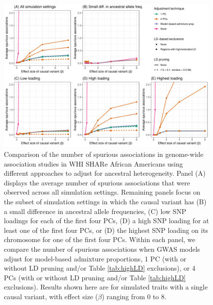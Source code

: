 \documentclass[12pt]{article}
\begin{document}
\begin{figure}
\includegraphics[width=\textwidth]{figs/spurious_counts/gwas/spurious_allbeta}
\caption{Comparison of the number of spurious associations in genome-wide association studies in WHI SHARe African Americans using different approaches to adjust for ancestral heterogeneity. Panel (A) displays the average number of spurious associations that were observed across all simulation settings. Remaining panels focus on the subset of simulation settings in which the causal variant has (B) a small difference in ancestral allele frequencies, (C) low SNP loadings for each of the first four PCs, (D) a high SNP loading for at least one of the first four PCs, or (D) the highest SNP loading on its chromosome for one of the first four PCs. Within each panel, we compare the number of spurious associations when GWAS models adjust for model-based admixture proportions, 1 PC (with or without LD pruning and/or Table \ref{tab:highLD} exclusions), or 4 PCs (with or without LD pruning and/or Table \ref{tab:highLD} exclusions). Results shown here are for simulated traits with a single causal variant, with effect size ($\beta$) ranging from 0 to 8.}
\label{fig:spurious}
\end{figure}
\end{document}
